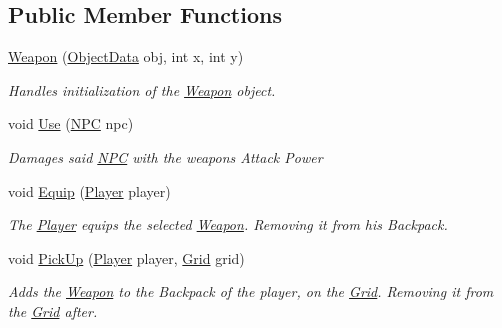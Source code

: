 \subsection*{Public Member Functions}
\begin{DoxyCompactItemize}
\item 
\mbox{\hyperlink{class_roguelike_r_p_g_1_1_weapon_a150f41f8b59b68c93eba9b01efa812b9}{Weapon}} (\mbox{\hyperlink{struct_roguelike_r_p_g_1_1_object_data}{Object\+Data}} obj, int x, int y)
\begin{DoxyCompactList}\small\item\em Handles initialization of the \mbox{\hyperlink{class_roguelike_r_p_g_1_1_weapon}{Weapon}} object. \end{DoxyCompactList}\item 
void \mbox{\hyperlink{class_roguelike_r_p_g_1_1_weapon_abc7ba430a40dc00c52d2ae10a1005eeb}{Use}} (\mbox{\hyperlink{class_roguelike_r_p_g_1_1_n_p_c}{N\+PC}} npc)
\begin{DoxyCompactList}\small\item\em Damages said \mbox{\hyperlink{class_roguelike_r_p_g_1_1_n_p_c}{N\+PC}} with the weapon\textquotesingle{}s Attack Power \end{DoxyCompactList}\item 
void \mbox{\hyperlink{class_roguelike_r_p_g_1_1_weapon_a08c34d6e41739612a4c69fd019fce3d7}{Equip}} (\mbox{\hyperlink{class_roguelike_r_p_g_1_1_player}{Player}} player)
\begin{DoxyCompactList}\small\item\em The \mbox{\hyperlink{class_roguelike_r_p_g_1_1_player}{Player}} equips the selected \mbox{\hyperlink{class_roguelike_r_p_g_1_1_weapon}{Weapon}}. Removing it from his Backpack. \end{DoxyCompactList}\item 
void \mbox{\hyperlink{class_roguelike_r_p_g_1_1_weapon_a583cc9a8265e81bc38d69851bdd6d36a}{Pick\+Up}} (\mbox{\hyperlink{class_roguelike_r_p_g_1_1_player}{Player}} player, \mbox{\hyperlink{class_roguelike_r_p_g_1_1_grid}{Grid}} grid)
\begin{DoxyCompactList}\small\item\em Adds the \mbox{\hyperlink{class_roguelike_r_p_g_1_1_weapon}{Weapon}} to the Backpack of the player, on the \mbox{\hyperlink{class_roguelike_r_p_g_1_1_grid}{Grid}}. Removing it from the \mbox{\hyperlink{class_roguelike_r_p_g_1_1_grid}{Grid}} after. \end{DoxyCompactList}\end{DoxyCompactItemize}
